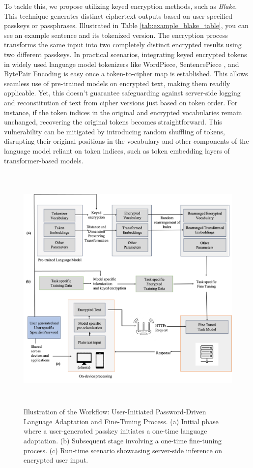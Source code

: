 \documentclass[letterpaper]{article} %
\begin{document}
To tackle this, we propose utilizing keyed encryption methods, such as \textit{Blake}. This technique generates distinct ciphertext outputs based on user-specified passkeys or passphrases.  Illustrated in Table \ref{tab:example_blake_table}, you can see an example sentence and its tokenized version. The encryption process transforms the same input into two completely distinct encrypted results using two different passkeys. In practical scenarios, integrating keyed encrypted tokens in widely used language model tokenizers like WordPiece, SentencePiece \cite{kudo2018sentencepiece}, and BytePair Encoding \cite{shibata1999byte} is easy once a token-to-cipher map is established. This allows seamless use of pre-trained models on encrypted text, making them readily applicable. Yet, this doesn't guarantee safeguarding against server-side logging and reconstitution of text from cipher versions just based on token order. For instance, if the token indices in the original and encrypted vocabularies remain unchanged, recovering the original tokens becomes straightforward. This vulnerability can be mitigated by introducing random shuffling of tokens, disrupting their original positions in the vocabulary and other components of the language model reliant on token indices, such as token embedding layers of transformer-based models.
\begin{figure}[t]
    \centering
    \includegraphics[width=14cm, height=12.5cm]{network_diagram.png}
    \caption{Illustration of the Workflow: User-Initiated Password-Driven Language Adaptation and Fine-Tuning Process. (a) Initial phase where a user-generated passkey initiates a one-time language adaptation. (b) Subsequent stage involving a one-time fine-tuning process. (c) Run-time scenario showcasing server-side inference on encrypted user input.}
    \label{fig:flowdiag}
\end{figure}
\end{document}
